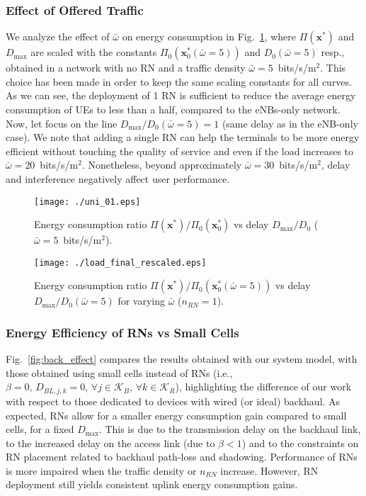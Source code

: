 \documentclass[draftcls,onecolumn]{IEEEtran}
\theoremstyle{plain}
\theoremstyle{definition}
\begin{document}
\subsubsection{Effect of Offered Traffic}
We analyze the effect of $\bar{\omega}$ on energy consumption in Fig.~\ref{fig:load_final}, where $\Pi(\boldsymbol{x}^*)$ and $D_{\max}$ are scaled with the constants $\Pi_0(\boldsymbol{x}_0^*(\bar{\omega}=5))$ and $D_{0}(\bar{\omega}=5)$ resp., obtained in a network with no RN and a traffic density $\bar{\omega}=5$~bits/s/m$^2$. This choice has been made in order to keep the same scaling constants for all curves. 
As we can see, the deployment of 1 RN is sufficient to reduce the average energy consumption of UEs to less than a half, compared to the eNBs-only network.
Now, let focus on the line $D_{\max}/ D_0(\bar{\omega}=5){=}1$ (same delay as in the eNB-only case). We note that adding a single RN can help the terminals to be more energy efficient without touching the quality of service and even if the load increases to $\bar{\omega}=20$~bits/s/m$^2$. Nonetheless, beyond approximately $\bar{\omega}=30$~bits/s/m$^2$, delay and interference negatively affect user performance. 



\begin{figure}
\centering
\begin{minipage}{.47\textwidth}
\centering
\texttt{[image: ./uni\_01.eps]} 
\caption{Energy consumption ratio $\Pi (\boldsymbol{x}^*) / \Pi_0(\boldsymbol{x}^*_{0})$ vs delay $D_{\max}/D_0$ ($\bar{\omega}=5$~bits/s/m$^2$).}\label{fig:uni_01}
\end{minipage}\hfill
\begin{minipage}{.47\textwidth}
\centering
\texttt{[image: ./load\_final\_rescaled.eps]}
\caption{Energy consumption ratio $\Pi (\boldsymbol{x}^*) /\Pi_0(\boldsymbol{x}_0^*(\bar{\omega}=5))$ vs delay $D_{\max}/ D_0(\bar{\omega}=5)$ for varying $\bar{\omega}$ ($n_{RN}=1$).}
\label{fig:load_final}
\end{minipage}
\end{figure}


\subsubsection{Energy Efficiency of RNs vs Small Cells}
Fig.~\ref{fig:back_effect} compares the results obtained with our system model, with those obtained using small cells instead of RNs (i.e., $\beta=0,\, D_{BL,j,k}=0,\, \forall j \in \mathcal{K}_{B},\, \forall k \in \mathcal{K}_{R}$), highlighting the difference of our work with respect to those dedicated to devices with wired (or ideal) backhaul. As expected, RNs allow for a smaller energy consumption gain compared to small cells, for a fixed $D_{\max}$. This is due to the transmission delay on the backhaul link, to the increased delay on the access link (due to $\beta<1$) and to the constraints on RN placement related to backhaul path-loss and shadowing. Performance of RNs is more impaired when the traffic density or $n_{RN}$ increase. 
However, RN deployment still yields consistent uplink energy consumption gains.     
\end{document}
